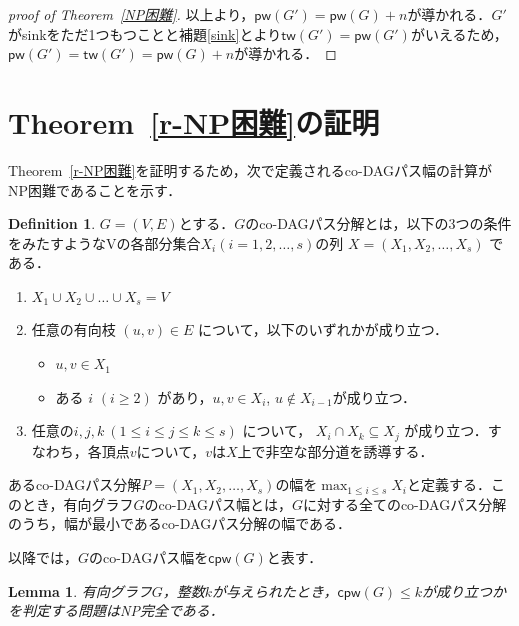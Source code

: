 \documentclass[master]{kuisthesis}		%
\theoremstyle{plain}
\newtheorem{lemma}{Lemma}
\theoremstyle{definition}
\newtheorem{definition*}{Definition}
\begin{document}
{\begin{proof}[proof of Theorem~\ref{NP困難}]
    以上より，$\mathsf{pw}(G') = \mathsf{pw}(G) + n$が導かれる．$G'$がsinkをただ1つもつことと補題\ref{sink}とより$\mathsf{tw}(G') = \mathsf{pw}(G')$がいえるため，$\mathsf{pw}(G') = \mathsf{tw}(G') = \mathsf{pw}(G) + n$が導かれる．
    
\end{proof}








\section{Theorem~\ref{r-NP困難}の証明}

Theorem~\ref{r-NP困難}を証明するため，次で定義されるco-DAGパス幅の計算がNP困難であることを示す．

\begin{definition*}
     $G=(V, E)$とする．$G$のco-DAGパス分解とは，以下の3つの条件をみたすようなVの各部分集合$ X_i (i = 1, 2,  \ldots, s)$の列 $X=(X_1, X_2,  \ldots, X_s)$ である．

    \begin{enumerate}
        \item $ X_1 \cup X_2 \cup \dots \cup X_s = V $ 
        \item 任意の有向枝 $ (u, v) \in E $ について，以下のいずれかが成り立つ．
        \begin{itemize}
            \item $u, v \in X_1$
        \item ある $i$ $(i \geq 2)$ があり，$u, v \in X_i$, $u \notin X_{i-1}$が成り立つ．
        \end{itemize}
        \item 任意の$ i, j, k\ (1 \leq i \leq j \leq k \leq s)$ について， $X_i \cap X_k \subseteq X_j$ が成り立つ．すなわち，各頂点$v$について，$v$は$X$上で非空な部分道を誘導する．
    \end{enumerate}
    あるco-DAGパス分解$P = (X_1, X_2,   \ldots, X_s)$の幅を$\max_{1 \leq i \leq s} {X_i}$と定義する．このとき，有向グラフ$G$のco-DAGパス幅とは，$G$に対する全てのco-DAGパス分解のうち，幅が最小であるco-DAGパス分解の幅である．
    
\end{definition*}
 
以降では，$G$のco-DAGパス幅を$\mathsf{cpw}(G)$と表す．





\begin{lemma}\label{co-DAGパス分解}
    有向グラフ$G$，整数$k$が与えられたとき，$\mathsf{cpw}(G) \leq k$が成り立つかを判定する問題はNP完全である．
\end{lemma}

}
\end{document}
